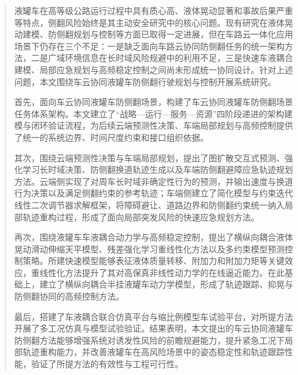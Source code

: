 
\begin{abstract}
液罐车在高等级公路运行过程中具有质心高、液体晃动显著和事故后果严重等特点，侧翻风险始终是其主动安全研究中的核心问题。现有研究在液体晃动建模、防侧翻规划与控制等方面已取得一定进展，但在车路云一体化应用场景下仍存在三个不足：一是缺乏面向车路云协同防侧翻任务的统一架构方法，二是广域环境信息在长时域风险规避中的利用不足，三是快速车液耦合建模、局部应急规划与高频稳定控制之间尚未形成统一协同设计。针对上述问题，本文围绕车云协同液罐车防侧翻行驶规划与控制开展系统研究。

首先，面向车云协同液罐车防侧翻场景，构建了车云协同液罐车防侧翻场景任务体系架构。本文建立了“战略—运行—服务—资源”四阶段递进的架构建模与闭环验证流程，为后续云端预测性决策、车端局部规划与高频控制提供了统一的系统边界、时间尺度约束和接口组织依据。

其次，围绕云端预测性决策与车端局部规划，提出了图扩散交互式预测、强化学习长时域决策、防侧翻换道轨迹生成以及车端防侧翻避障应急轨迹规划方法。云端侧实现了对周车长时域非确定性行为的预测，并输出速度与换道行为决策以及满足侧翻约束的参考轨迹；车端侧建立了简化模型与约束迭代线性二次调节器求解框架，将障碍避让、道路边界和防侧翻约束统一纳入局部轨迹重构过程，形成了面向局部突发风险的快速应急规划方法。

再次，围绕液罐车车液耦合动力学与高频稳定控制，提出了横纵向耦合液体晃动滑动伸缩天平模型、残差强化学习重线性化方法以及多约束模型预测控制策略。所建快速模型能够表征液体质量转移、附加力和附加力矩等关键效应，重线性化方法提升了其对高保真非线性动力学的在线逼近能力。在此基础上，建立了横纵向耦合半挂液罐车动力学模型，形成了轨迹跟踪、抑晃与防侧翻协同的高频控制方法。

最后，搭建了车液耦合联合仿真平台与缩比例模型车试验平台，对所提方法开展了多工况仿真与模型试验验证。结果表明，本文提出的车云协同液罐车防侧翻方法能够增强系统对诱发性风险的前瞻规避能力，提升紧急工况下局部轨迹重构能力，并改善液罐车在高风险场景中的姿态稳定性和轨迹跟踪性能，验证了所提方法的有效性与工程可行性。

\end{abstract}

